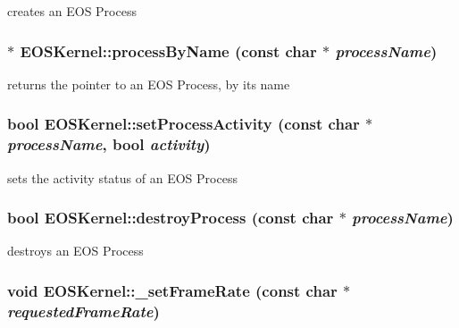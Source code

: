 creates an EOS Process 

\hypertarget{structEOSKernel_9b9fa8938a1ad005b3b55df2aa4ba32c}{
\subsubsection[{processByName}]{ $\ast$ EOSKernel::processByName (const char $\ast$ {\em processName})}}
\label{structEOSKernel_9b9fa8938a1ad005b3b55df2aa4ba32c}


returns the pointer to an EOS Process, by its name 

\hypertarget{structEOSKernel_9ab346976e19d85ebfbad260b3913734}{
\subsubsection[{setProcessActivity}]{\setlength{\rightskip}{0pt plus 5cm}bool EOSKernel::setProcessActivity (const char $\ast$ {\em processName}, \/  bool {\em activity})}}
\label{structEOSKernel_9ab346976e19d85ebfbad260b3913734}


sets the activity status of an EOS Process 

\hypertarget{structEOSKernel_214499b9e8c0ab67eddd377a780cb3fa}{
\subsubsection[{destroyProcess}]{\setlength{\rightskip}{0pt plus 5cm}bool EOSKernel::destroyProcess (const char $\ast$ {\em processName})}}
\label{structEOSKernel_214499b9e8c0ab67eddd377a780cb3fa}


destroys an EOS Process 

\hypertarget{structEOSKernel_4b51e69b7ddd8e0fa02a339dfb5f86f9}{
\subsubsection[{\_\-setFrameRate}]{\setlength{\rightskip}{0pt plus 5cm}void EOSKernel::\_\-setFrameRate (const char $\ast$ {\em requestedFrameRate})}}
\label{structEOSKernel_4b51e69b7ddd8e0fa02a339dfb5f86f9}


